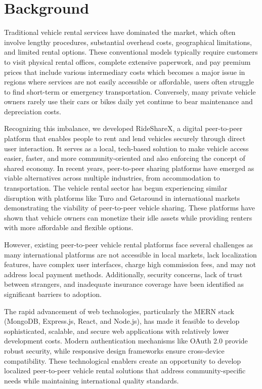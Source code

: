 \documentclass[12pt,a4paper]{report}
\begin{document}
	
	\section{Background}
	Traditional vehicle rental services have dominated the market, which often involve lengthy procedures, substantial overhead costs, geographical limitations, and limited rental options. These conventional models typically require customers to visit physical rental offices, complete extensive paperwork, and pay premium prices that include various intermediary costs which becomes a major issue in regions where services are not easily accessible or affordable, users often struggle to find short-term or emergency transportation. Conversely, many private vehicle owners rarely use their cars or bikes daily yet continue to bear maintenance and depreciation costs.
    
    Recognizing this imbalance, we developed RideShareX, a digital peer-to-peer platform that enables people to rent and lend vehicles securely through direct user interaction. It serves as a local, tech-based solution to make vehicle access easier, faster, and more community-oriented and also enforcing the concept of shared economy.
    In recent years, peer-to-peer sharing platforms have emerged as viable alternatives across multiple industries, from accommodation to transportation. The vehicle rental sector has begun experiencing similar disruption with platforms like Turo\cite{turo} and Getaround\cite{getaround} in international markets demonstrating the viability of peer-to-peer vehicle sharing\cite{sharedEconomy}. These platforms have shown that vehicle owners can monetize their idle assets while providing renters with more affordable and flexible options. 
    
    However, existing peer-to-peer vehicle rental platforms face several challenges as many international platforms are not accessible in local markets, lack localization features, have complex user interfaces, charge high commission fees, and may not address local payment methods. Additionally, security concerns, lack of trust between strangers, and inadequate insurance coverage have been identified as significant barriers to adoption.
    
    The rapid advancement of web technologies, particularly the MERN stack (MongoDB, Express.js, React, and Node.js)\cite{mern}, has made it feasible to develop sophisticated, scalable, and secure web applications with relatively lower development costs. Modern authentication mechanisms like OAuth 2.0\cite{oauth} provide robust security, while responsive design frameworks ensure cross-device compatibility. These technological enablers create an opportunity to develop localized peer-to-peer vehicle rental solutions that address community-specific needs while maintaining international quality standards. 
\end{document}
